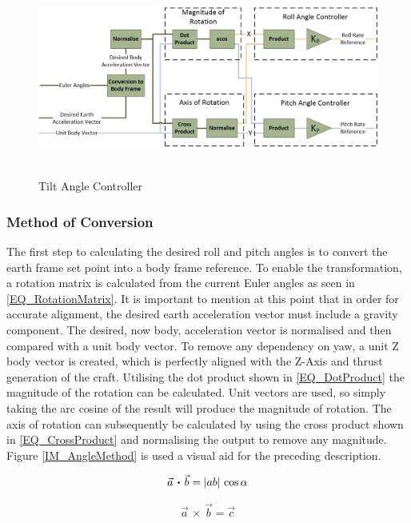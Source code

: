 	\begin{figure}[H]
		\centering
		\includegraphics[height = 6.5cm]{../References/Diagrams/TiltAngleController.jpg}
		\caption{Tilt Angle Controller}
		\label{IM_TiltAngleController}
	\end{figure}
		
		\subsubsection{Method of Conversion}	
		The first step to calculating the desired roll and pitch angles is to convert the earth frame set point into a body frame reference. To enable the transformation, a rotation matrix is calculated from the current Euler angles as seen in \eqref{EQ_RotationMatrix}. It is important to mention at this point that in order for accurate alignment, the desired earth acceleration vector must include a gravity component. The desired, now body, acceleration vector is normalised and then compared with a unit body vector. To remove any dependency on yaw, a unit Z body vector is created, which is perfectly aligned with the Z-Axis and thrust generation of the craft. Utilising the dot product shown in \eqref{EQ_DotProduct} the magnitude of the rotation can be calculated. Unit vectors are used, so simply taking the arc cosine of the result will produce the magnitude of rotation. The axis of rotation can subsequently be calculated by using the cross product shown in \eqref{EQ_CrossProduct} and normalising the output to remove any magnitude. Figure \ref{IM_AngleMethod} is used a visual aid for the preceding description.
		
 		\begin{equation}
 		\label{EQ_DotProduct}
 		\vec{a} \, \bigcdot \, \vec{b} = |ab|\,\cos \alpha
 		\end{equation}
 		
 		\begin{equation}
 		\label{EQ_CrossProduct}
 		\vec{a} \, \times \, \vec{b} = \vec{c}
 		\end{equation}
		
